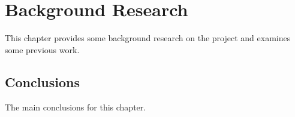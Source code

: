 \chapter{Background Research}\label{ch:Background}

This chapter provides some background research on the project and examines some previous work.

\section{Conclusions}

The main conclusions for this chapter.
